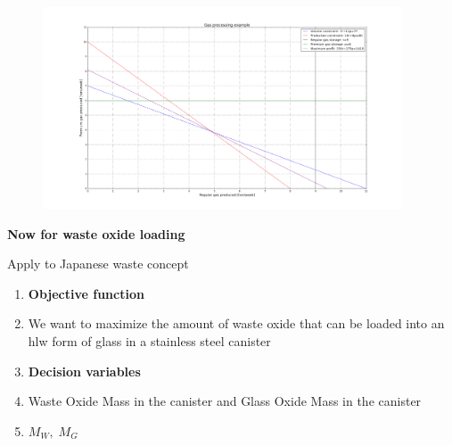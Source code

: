 \documentclass[aspectratio=1610,pdftex,dvipsnames,compress,xcolor={dvipsnames}]{beamer}
\newcommand{\acs}{\acrshort} %
\begin{document}
\begin{frame}{}
    \begin{figure}
        \centering
        \includegraphics[width=0.95\textwidth]{gas.profit.jpg}
    \end{figure}
\end{frame}


\begin{frame}[plain]{}
    \centering\Large\textbf{Now for waste oxide loading}
\end{frame}


\addtocounter{framenumber}{-1} 
\begin{frame}{Apply to Japanese waste concept}
    \begin{enumerate}[series=outerlist,topsep=0pt,itemsep=3pt,leftmargin=*,label=(\arabic*)]
        \item[]\textbf{Objective function}
        \item[]We want to maximize the amount of waste oxide that can be loaded into an \acs{hlw} form of glass in a stainless steel canister
            \vspace{0.25in}
        \item[]\textbf{Decision variables}
        \item[]Waste Oxide Mass in the canister and Glass Oxide Mass in the canister
        \item[]$M_W, \; M_G$
    \end{enumerate}
\end{frame}
\end{document}
